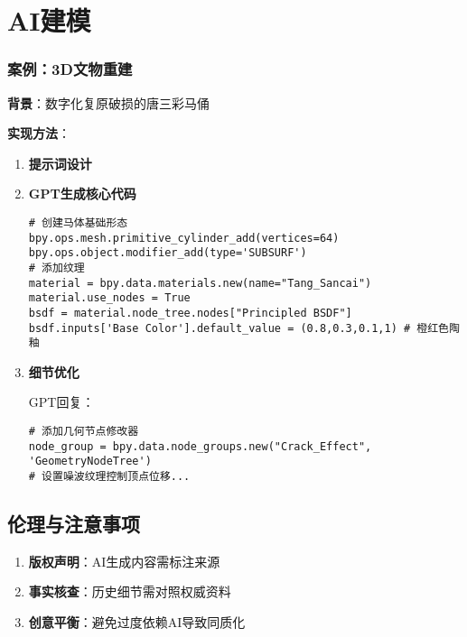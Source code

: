 \hypertarget{ux6848ux4f8b2ux5386ux53f2ux8fdbux7a0bux6d41ux7a0bux56fe}{%
\section{AI建模}
\subsubsection{案例：3D文物重建}\label{ux6848ux4f8b2ux5386ux53f2ux8fdbux7a0bux6d41ux7a0bux56fe}}
\textbf{背景}：数字化复原破损的唐三彩马俑

\textbf{实现方法}：

\begin{enumerate}
\def\labelenumi{\arabic{enumi}.}
\item
  \textbf{提示词设计} 
\item
  \textbf{GPT生成核心代码}
\begin{gptbox}
\small{
\begin{lstlisting}
# 创建马体基础形态
bpy.ops.mesh.primitive_cylinder_add(vertices=64)
bpy.ops.object.modifier_add(type='SUBSURF')
# 添加纹理
material = bpy.data.materials.new(name="Tang_Sancai")
material.use_nodes = True
bsdf = material.node_tree.nodes["Principled BSDF"]
bsdf.inputs['Base Color'].default_value = (0.8,0.3,0.1,1) # 橙红色陶釉
\end{lstlisting}
}
\end{gptbox}
\item
  \textbf{细节优化} 
  
  GPT回复：
\begin{gptbox}
\small{
\begin{lstlisting}
# 添加几何节点修改器
node_group = bpy.data.node_groups.new("Crack_Effect", 'GeometryNodeTree')
# 设置噪波纹理控制顶点位移...
\end{lstlisting}
}
\end{gptbox}
\end{enumerate}

\hypertarget{ux4f26ux7406ux4e0eux6ce8ux610fux4e8bux9879}{%
\subsection{伦理与注意事项}\label{ux4f26ux7406ux4e0eux6ce8ux610fux4e8bux9879}}

\begin{enumerate}
\def\labelenumi{\arabic{enumi}.}
\item
  \textbf{版权声明}：AI生成内容需标注来源
\item
  \textbf{事实核查}：历史细节需对照权威资料
\item
  \textbf{创意平衡}：避免过度依赖AI导致同质化
\end{enumerate}



